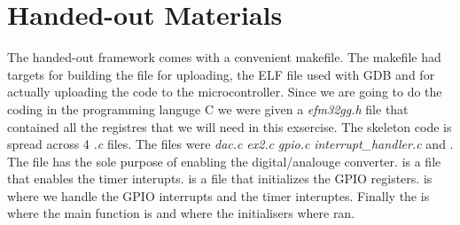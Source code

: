\section{Handed-out Materials}
The handed-out framework comes with a convenient makefile.
The makefile had targets for building the file for uploading, the ELF file used with GDB and for actually uploading the code to the microcontroller.
Since we are going to do the coding in the programming languge C we were given a \emph{efm32gg.h} file that contained all the registres that we will need in this exsercise.
The skeleton code is spread across 4 \emph{.c} files.
The files were \emph{dac.c} \emph{ex2.c} \emph{gpio.c} \emph{interrupt_handler.c} and .
The  file has the sole purpose of enabling the digital/analouge converter.
 is a file that enables the timer interupts.
 is a file that initializes the GPIO registers.
 is where we handle the GPIO interrupts and the timer interuptes.
Finally the  is where the main function is and where the initialisers where ran.
